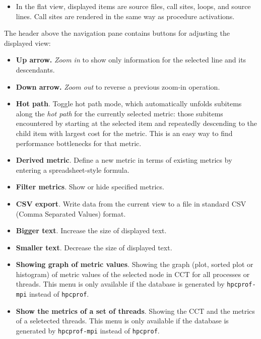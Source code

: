 \documentclass[english]{article}
\begin{document}
\begin{itemize}
\begin{itemize}
\item In the flat view, displayed items are
source files, call sites, loops, and source lines.
Call sites are rendered in the same way as procedure activations.

\end{itemize}

The header above the navigation pane contains buttons for adjusting the displayed view:

\begin{itemize}

\item \textbf{Up arrow.} \emph{Zoom in} to show only information for the selected line and its descendants.

\item \textbf{Down arrow.} \emph{Zoom out} to reverse a previous zoom-in operation.

\item \textbf{Hot path}. Toggle hot path mode,
which automatically unfolds subitems along the \emph{hot path} for the currently selected metric:
those subitems encountered by starting at the selected item
and repeatedly descending to the child item with largest cost for the metric.
This is an easy way to find performance bottlenecks for that metric.

\item \textbf{Derived metric}. Define a new metric in terms of existing metrics
by entering a spreadsheet-style formula.

\item \textbf{Filter metrics}. Show or hide specified metrics.

\item \textbf{CSV export}. Write data from the current view to a file
in standard CSV (Comma Separated Values) format.

\item \textbf{Bigger text}. Increase the size of displayed text.

\item \textbf{Smaller text}. Decrease the size of displayed text.

\item \textbf{Showing graph of metric values}.
Showing the graph (plot, sorted plot or histogram) of metric values of the selected node in CCT for all processes or threads.
This menu is only available if the database is generated by \texttt{hpcprof-mpi} instead of \texttt{hpcprof}. 

\item \textbf{Show the metrics of a set of threads}.
Showing the CCT and the metrics of a seletected threads.
This menu is only available if the database is generated by \texttt{hpcprof-mpi} instead of \texttt{hpcprof}. 
 



\end{itemize}
\end{itemize}
\end{document}
